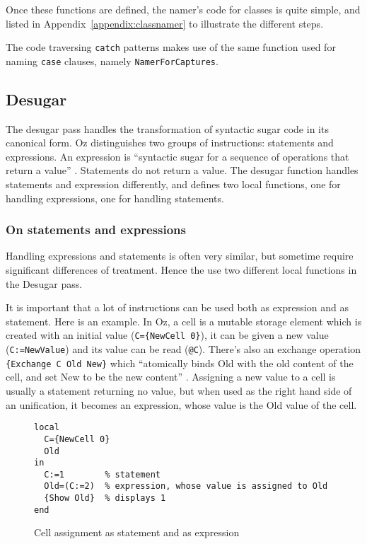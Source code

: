 \documentclass[a4paper]{memoir}
\begin{document}
Once these functions are defined, the namer's code for classes is quite simple,
and listed in Appendix~\ref{appendix:classnamer} to illustrate the different steps.


The code traversing \lstinline!catch! patterns makes use of the same
function used for naming \lstinline!case! clauses, namely
\lstinline!NamerForCaptures!.



\subsection{Desugar}\label{sec:arch:desugar}
The desugar pass handles the transformation of syntactic sugar code in its canonical form.
Oz distinguishes two groups of instructions: statements and expressions. An expression is ``syntactic sugar for a sequence of operations that return a value'' \cite{CTMCP}. Statements do not return a value.
The desugar function handles statements and expression differently, and defines two local functions, one for handling expressions, one for handling statements.
\subsubsection{On statements and expressions}
Handling expressions and statements is often very similar, but sometime require significant differences of treatment. Hence the use two different local functions in the Desugar pass.

It is important that a lot of instructions can be used both as expression and as
statement. Here is an example.
In Oz, a cell is a mutable storage element which is created with an initial value (\lstinline!C={NewCell 0}!), it can be given a new value (\lstinline!C:=NewValue!) and its value can be read (\lstinline!@C!). There's also an exchange operation \lstinline!{Exchange C Old New}! which ``atomically binds Old with the old content of the cell, and set New to be the new content'' \cite{CTMCP}.%
Assigning a new value to a cell is usually a statement returning no value, but
when used as the right hand side of an unification, it becomes an expression,
whose value is the Old value of the cell.
\begin{figure}[h]
\begin{lstlisting}
local
  C={NewCell 0}
  Old
in
  C:=1        % statement
  Old=(C:=2)  % expression, whose value is assigned to Old
  {Show Old}  % displays 1
end

\end{lstlisting}
\caption{Cell assignment as statement and as expression}
\label{fig:statement_and_expression1}
\end{figure}
\end{document}
